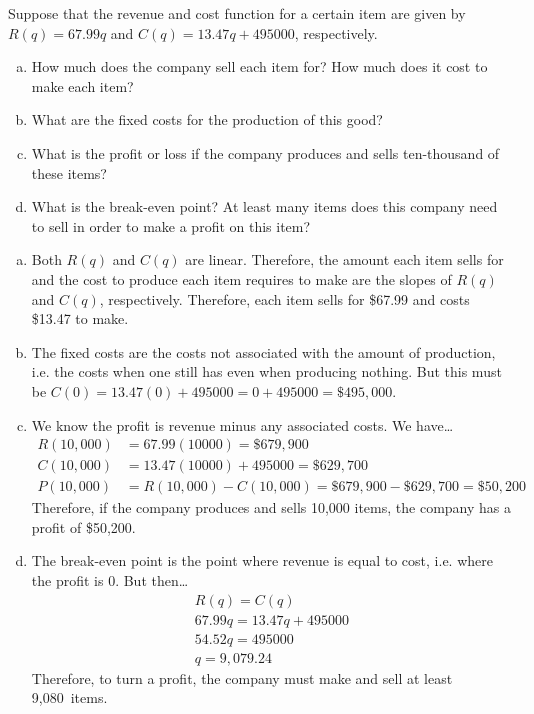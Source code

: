 \documentclass[11pt,letterpaper]{article}
\begin{document}

 Suppose that the revenue and cost function for a certain item are given by $R(q)= 67.99q$ and $C(q)= 13.47q + 495000$, respectively. 
	\begin{enumerate}[(a)]
	\item How much does the company sell each item for? How much does it cost to make each item?
	\item What are the fixed costs for the production of this good?
	\item What is the profit or loss if the company produces and sells ten-thousand of these items?
	\item What is the break-even point? At least many items does this company need to sell in order to make a profit on this item?
	\end{enumerate} \pspace

\sol 
\begin{enumerate}[(a)]
\item Both $R(q)$ and $C(q)$ are linear. Therefore, the amount each item sells for and the cost to produce each item requires to make are the slopes of $R(q)$ and $C(q)$, respectively. Therefore, each item sells for \$67.99 and costs \$13.47 to make. \pspace

\item The fixed costs are the costs not associated with the amount of production, i.e. the costs when one still has even when producing nothing. But this must be $C(0)= 13.47(0) + 495000= 0 + 495000= \$495,\!000$. \pspace

\item We know the profit is revenue minus any associated costs. We have\dots
	\[
	\begin{aligned}
	R(10,\!000)&= 67.99(10000)= \$679,\!900 \\
	C(10,\!000)&= 13.47(10000) + 495000= \$629,\!700 \\
	P(10,\!000)&= R(10,\!000) - C(10,\!000)= \$679,\!900 - \$629,\!700= \$50,\!200
	\end{aligned}
	\]
Therefore, if the company produces and sells 10,000 items, the company has a profit of \$50,200. \pspace

\item The break-even point is the point where revenue is equal to cost, i.e. where the profit is 0. But then\dots
	\[
	\begin{gathered}
	R(q)= C(q) \\
	67.99q= 13.47q + 495000 \\
	54.52q= 495000 \\
	q= 9,\!079.24
	\end{gathered}
	\]
Therefore, to turn a profit, the company must make and sell at least 9,080~items. 
\end{enumerate}
\end{document}
